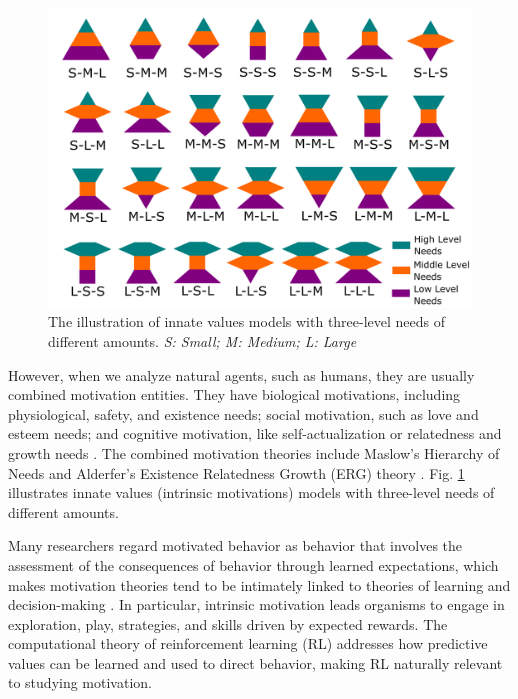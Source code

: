 \documentclass[letterpaper]{article} %
\begin{document}
\begin{figure}[t]
\centering
\includegraphics[width=1\columnwidth]{./figures/innate_values_models.pdf}
\caption{The illustration of innate values models with three-level needs of different amounts. \textit{S: Small; M: Medium; L: Large}}
\label{fig:overview}
\end{figure}

However, when we analyze natural agents, such as humans, they are usually combined motivation entities. They have biological motivations, including physiological, safety, and existence needs; social motivation, such as love and esteem needs; and cognitive motivation, like self-actualization or relatedness and growth needs \cite{merrick2009motivated}. The combined motivation theories include Maslow's Hierarchy of Needs \cite{maslow1958dynamic} and Alderfer's Existence Relatedness Growth (ERG) theory \cite{alderfer1972existence}. Fig. \ref{fig:overview} illustrates innate values (intrinsic motivations) models with three-level needs of different amounts.

Many researchers regard motivated behavior as behavior that involves the assessment of the consequences of behavior through learned expectations, which makes motivation theories tend to be intimately linked to theories of learning and decision-making \cite{baldassarre2013intrinsically}. In particular, intrinsic motivation leads organisms to engage in exploration, play, strategies, and skills driven by expected rewards. The computational theory of reinforcement learning (RL) addresses how predictive values can be learned and used to direct behavior, making RL naturally relevant to studying motivation.
\end{document}
